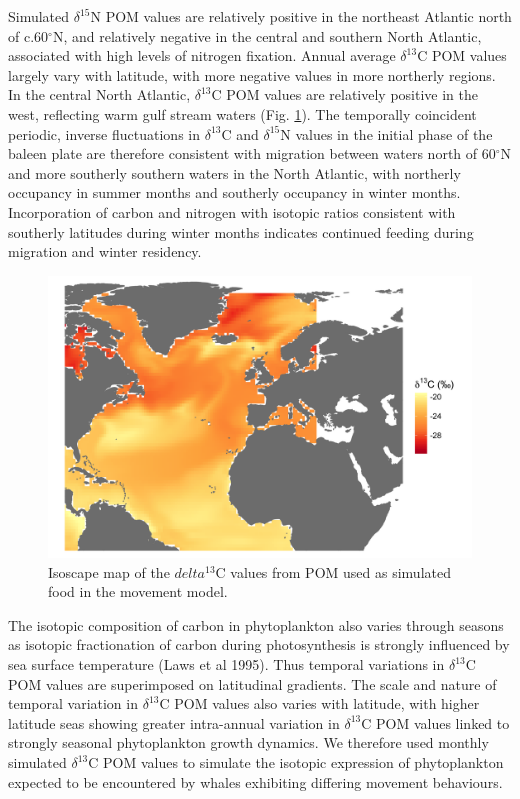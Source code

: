 \documentclass[a4paper,12pt]{article}
\begin{document}
Simulated $\delta^{15}$N POM values are relatively positive in the northeast Atlantic north of c.60$^{\circ}$N, and relatively negative in the central and southern North Atlantic, associated with high levels of nitrogen fixation. 
Annual average $\delta^{13}$C POM values largely vary with latitude, with more negative values in more northerly regions. 
In the central North Atlantic, $\delta^{13}$C POM values are relatively positive in the west, reflecting warm gulf stream waters (Fig. \ref{figs3}). 
The temporally coincident periodic, inverse fluctuations in $\delta^{13}$C and $\delta^{15}$N values in the initial phase of the baleen plate are therefore consistent with migration between waters north of 60$^{\circ}$N and more southerly southern waters in the North Atlantic, with northerly occupancy in summer months and southerly occupancy in winter months. 
Incorporation of carbon and nitrogen with isotopic ratios consistent with southerly latitudes during winter months indicates continued feeding during migration and winter residency.
 
\begin{figure}[!htbp]
  \centering
  \includegraphics[width = \linewidth]{figures/Figure-S3-plankton-d13C-map.png}
  \caption{Isoscape map of the $delta^{13}$C values from POM used as simulated food in the movement model.}
  \label{figs3} 
\end{figure}

The isotopic composition of carbon in phytoplankton also varies through seasons as isotopic fractionation of carbon during photosynthesis is strongly influenced by sea surface temperature (Laws et al 1995). 
Thus temporal variations in $\delta^{13}$C POM values are superimposed on latitudinal gradients. 
The scale and nature of temporal variation in $\delta^{13}$C POM values also varies with latitude, with higher latitude seas showing greater intra-annual variation in $\delta^{13}$C POM values linked to strongly seasonal phytoplankton growth dynamics. 
We therefore used monthly simulated $\delta^{13}$C POM values to simulate the isotopic expression of phytoplankton expected to be encountered by whales exhibiting differing movement behaviours.
 
\end{document}
